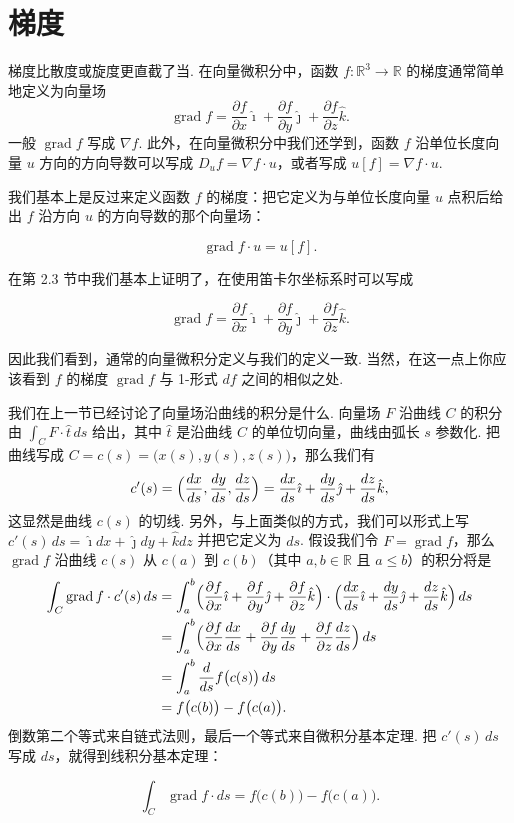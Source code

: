 \section{梯度}

梯度比散度或旋度更直截了当. 在向量微积分中，函数 $f:\mathbb{R}^3\to\mathbb{R}$ 的梯度通常简单地定义为向量场
\[
\operatorname{grad}f=\frac{\partial f}{\partial x}\hat{\imath}+\frac{\partial f}{\partial y}\hat{\jmath}+\frac{\partial f}{\partial z}\hat{k}.
\]
一般 $\operatorname{grad}f$ 写成 $\nabla f$. 此外，在向量微积分中我们还学到，函数 $f$ 沿单位长度向量 $u$ 方向的方向导数可以写成 $D_uf=\nabla f\cdot u$，或者写成 $u[f]=\nabla f\cdot u$.

我们基本上是反过来定义函数 $f$ 的梯度：把它定义为与单位长度向量 $u$ 点积后给出 $f$ 沿方向 $u$ 的方向导数的那个向量场：
\begin{definition}[梯度的定义]\label{def:9-3-1}
\[
\operatorname{grad}f\cdot u=u[f].
\]
\end{definition}

在第 2.3 节中我们基本上证明了，在使用笛卡尔坐标系时可以写成
\begin{theorem}\label{thm:9-5}
\[
\operatorname{grad}f=\frac{\partial f}{\partial x}\hat{\imath}+\frac{\partial f}{\partial y}\hat{\jmath}+\frac{\partial f}{\partial z}\hat{k}.
\]
\end{theorem}
因此我们看到，通常的向量微积分定义与我们的定义一致. 当然，在这一点上你应该看到 $f$ 的梯度 $\operatorname{grad}f$ 与 1-形式 $df$ 之间的相似之处.

我们在上一节已经讨论了向量场沿曲线的积分是什么. 向量场 $F$ 沿曲线 $C$ 的积分由 $\int_C F\cdot\hat{t}\,ds$ 给出，其中 $\hat{t}$ 是沿曲线 $C$ 的单位切向量，曲线由弧长 $s$ 参数化. 把曲线写成 $C=c(s)=\bigl(x(s),y(s),z(s)\bigr)$，那么我们有
\[
c'(s)=\Bigl(\frac{dx}{ds},\frac{dy}{ds},\frac{dz}{ds}\Bigr)=\frac{dx}{ds}\hat{\imath}+\frac{dy}{ds}\hat{\jmath}+\frac{dz}{ds}\hat{k},
\]
这显然是曲线 $c(s)$ 的切线. 另外，与上面类似的方式，我们可以形式上写 $c'(s)\,ds=\hat{\imath}dx+\hat{\jmath}dy+\hat{k}dz$ 并把它定义为 $ds$. 假设我们令 $F=\operatorname{grad}f$，那么 $\operatorname{grad}f$ 沿曲线 $c(s)$ 从 $c(a)$ 到 $c(b)$（其中 $a,b\in\mathbb{R}$ 且 $a\leq b$）的积分将是
\[
\begin{aligned}
\int_C\operatorname{grad}f\cdot c'(s)\,ds
&=\int_a^b\Bigl(\frac{\partial f}{\partial x}\hat{\imath}+\frac{\partial f}{\partial y}\hat{\jmath}+\frac{\partial f}{\partial z}\hat{k}\Bigr)\cdot\Bigl(\frac{dx}{ds}\hat{\imath}+\frac{dy}{ds}\hat{\jmath}+\frac{dz}{ds}\hat{k}\Bigr)\,ds\\
&=\int_a^b\Bigl(\frac{\partial f}{\partial x}\frac{dx}{ds}+\frac{\partial f}{\partial y}\frac{dy}{ds}+\frac{\partial f}{\partial z}\frac{dz}{ds}\Bigr)\,ds\\
&=\int_a^b\frac{d}{ds}f\bigl(c(s)\bigr)\,ds\\
&=f\bigl(c(b)\bigr)-f\bigl(c(a)\bigr).
\end{aligned}
\]
倒数第二个等式来自链式法则，最后一个等式来自微积分基本定理. 把 $c'(s)\,ds$ 写成 $ds$，就得到线积分基本定理：
\begin{theorem}[线积分基本定理]\label{thm:9-6}
\[
\int_C\operatorname{grad}f\cdot ds=f\bigl(c(b)\bigr)-f\bigl(c(a)\bigr).
\]
\end{theorem}


